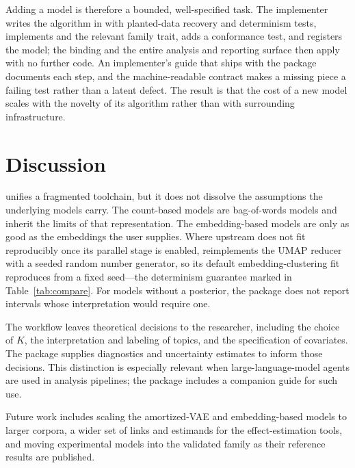 \documentclass[article]{jss}
\begin{document}
Adding a model is therefore a bounded, well-specified task. The implementer
writes the algorithm in  with planted-data recovery and
determinism tests, implements  and the relevant family trait,
adds a conformance test, and registers the model; the  binding and the
entire analysis and reporting surface then apply with no further code. An
implementer's guide that ships with the package documents each step, and the
machine-readable contract makes a missing piece a failing test rather than a
latent defect. The result is that the cost of a new model scales with the novelty
of its algorithm rather than with surrounding infrastructure.

\section{Discussion}\label{sec:discussion}

 unifies a fragmented toolchain, but it does not dissolve the
assumptions the underlying models carry. The count-based models are bag-of-words
models and inherit the limits of that representation. The embedding-based models
are only as good as the embeddings the user supplies. Where upstream
 does not fit reproducibly once its parallel stage is enabled,
 reimplements the UMAP reducer \citep{mcinnes2018umap} with a seeded
random number generator, so its default embedding-clustering fit reproduces from a
fixed seed---the determinism guarantee marked in Table~\ref{tab:compare}. For
models without a posterior, the package does not report intervals whose
interpretation would require one.

The workflow leaves theoretical decisions to the researcher, including the choice
of $K$, the interpretation and labeling of topics, and the specification of
covariates. The package supplies diagnostics and uncertainty estimates to inform
those decisions. This distinction is especially relevant when large-language-model
agents are used in analysis pipelines; the package includes a companion guide for
such use.

Future work includes scaling the amortized-VAE and embedding-based models to
larger corpora, a wider set of links and estimands for the effect-estimation
tools, and moving experimental models into the validated family as their
reference results are published.
\end{document}
